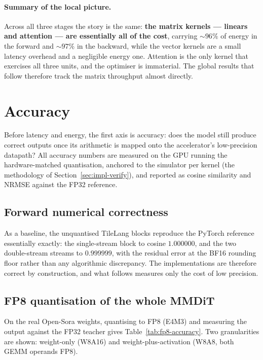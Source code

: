 \documentclass[11pt]{report}
\begin{document}
\paragraph{Summary of the local picture.} Across all three stages the story
is the same: \textbf{the matrix kernels --- linears and attention --- are
essentially all of the cost}, carrying ${\sim}96\%$ of energy in the
forward and ${\sim}97\%$ in the backward, while the vector kernels are a
small latency overhead and a negligible energy one. Attention is the only
kernel that exercises all three units, and the optimiser is immaterial. The
global results that follow therefore track the matrix throughput almost
directly.

\section{Accuracy}
\label{sec:results-accuracy}

Before latency and energy, the first axis is accuracy: does the model still
produce correct outputs once its arithmetic is mapped onto the
accelerator's low-precision datapath? All accuracy numbers are measured on
the GPU running the hardware-matched quantisation, anchored to the simulator
per kernel (the methodology of Section~\ref{sec:impl-verify}), and reported
as cosine similarity and NRMSE against the FP32 reference.

\subsection{Forward numerical correctness}

As a baseline, the unquantised TileLang blocks reproduce the PyTorch
reference essentially exactly: the single-stream block to cosine
$1.000000$, and the two double-stream streams to $0.999999$, with the
residual error at the BF16 rounding floor rather than any algorithmic
discrepancy. The implementations are therefore correct by construction, and
what follows measures only the cost of low precision.

\subsection{FP8 quantisation of the whole MMDiT}

On the real Open-Sora weights, quantising to FP8 (E4M3) and measuring the
output against the FP32 teacher gives Table~\ref{tab:fp8-accuracy}. Two
granularities are shown: weight-only (W8A16) and weight-plus-activation
(W8A8, both GEMM operands FP8).
\end{document}
